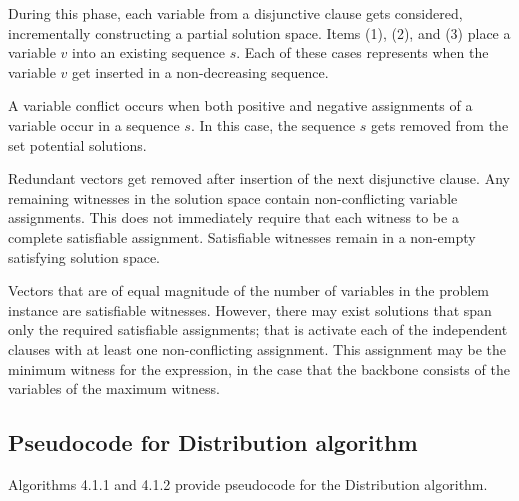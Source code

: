\FloatBarrier

		
During this phase, each variable from a disjunctive clause gets considered, incrementally constructing a partial solution space.  Items (1), (2), and (3) place a variable $v$ into an existing sequence $s$.  Each of these cases represents when the variable $v$ get inserted in a non-decreasing sequence.

A variable conflict occurs when both positive and negative assignments of a variable occur in a sequence $s$.  In this case, the sequence $s$ gets removed from the set potential solutions.

Redundant vectors get removed after insertion of the next disjunctive clause.  Any remaining witnesses in the solution space contain non-conflicting variable assignments.  This does not immediately require that each witness to be a complete satisfiable assignment. Satisfiable witnesses remain in a non-empty satisfying solution space.
		
		




Vectors that are of equal magnitude of the number of variables in the problem instance are satisfiable witnesses.  However, there may exist solutions that span only the required satisfiable assignments; that is activate each of the independent clauses with at least one non-conflicting assignment.  This assignment may be the minimum witness for the expression, in the case that the backbone consists of the variables of the maximum witness.

		
	\subsection{Pseudocode for Distribution algorithm}

Algorithms 4.1.1 and 4.1.2 provide pseudocode for the Distribution algorithm.  





%
%
%	



